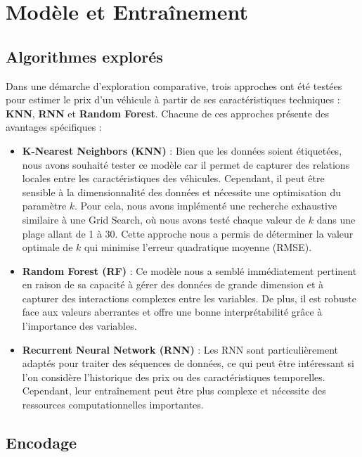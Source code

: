 \documentclass[12pt]{report}
\begin{document}
\section{Modèle et Entraînement}

\subsection{Algorithmes explorés}

Dans une démarche d'exploration comparative, trois approches ont été testées pour estimer le prix d’un véhicule à partir de ses caractéristiques techniques : \textbf{KNN}, \textbf{RNN} et \textbf{Random Forest}. Chacune de ces approches présente des avantages spécifiques :

\begin{itemize}
    \item \textbf{K-Nearest Neighbors (KNN)} : Bien que les données soient étiquetées, nous avons souhaité tester ce modèle car il permet de capturer des relations locales entre les caractéristiques des véhicules. Cependant, il peut être sensible à la dimensionnalité des données et nécessite une optimisation du paramètre \( k \). Pour cela, nous avons implémenté une recherche exhaustive similaire à une Grid Search, où nous avons testé chaque valeur de \( k \) dans une plage allant de 1 à 30. Cette approche nous a permis de déterminer la valeur optimale de \( k \) qui minimise l'erreur quadratique moyenne (RMSE).

    \item \textbf{Random Forest (RF)} : Ce modèle nous a semblé immédiatement pertinent en raison de sa capacité à gérer des données de grande dimension et à capturer des interactions complexes entre les variables. De plus, il est robuste face aux valeurs aberrantes et offre une bonne interprétabilité grâce à l'importance des variables.

    \item \textbf{Recurrent Neural Network (RNN)} : Les RNN sont particulièrement adaptés pour traiter des séquences de données, ce qui peut être intéressant si l'on considère l'historique des prix ou des caractéristiques temporelles. Cependant, leur entraînement peut être plus complexe et nécessite des ressources computationnelles importantes.
\end{itemize}



\subsection{Encodage}
\end{document}
